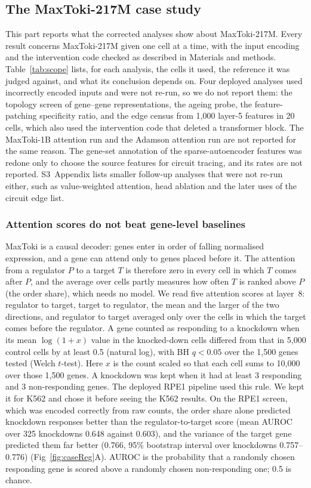 \subsection*{The MaxToki-217M case study}
This part reports what the corrected analyses show about MaxToki-217M.
Every result concerns MaxToki-217M given one cell at a time, with the
input encoding and the intervention code checked as described in
Materials and methods. Table~\ref{tab:scope} lists, for each analysis,
the cells it used, the reference it was judged against, and what its
conclusion depends on. Four deployed analyses used incorrectly encoded
inputs and were not re-run, so we do not report them: the topology
screen of gene--gene representations, the ageing probe, the
feature-patching specificity ratio, and the edge census from 1,000
layer-5 features in 20 cells, which also used the intervention code that
deleted a transformer block. The MaxToki-1B attention run and the
Adamson attention run are not reported for the same reason. The
gene-set annotation of the sparse-autoencoder features was redone only
to choose the source features for circuit tracing, and its rates are not
reported. S3~Appendix lists smaller follow-up analyses that were not
re-run either, such as value-weighted attention, head ablation and the
later uses of the circuit edge list.


\subsubsection*{Attention scores do not beat gene-level baselines}
MaxToki is a causal decoder: genes enter in order of falling normalised
expression, and a gene can attend only to genes placed before it. The
attention from a regulator $P$ to a target $T$ is therefore zero in every
cell in which $T$ comes after $P$, and the average over cells partly
measures how often $T$ is ranked above $P$ (the order share), which
needs no model. We read five attention scores at layer~8: regulator to target, target to
regulator, the mean and the larger of the two directions, and regulator
to target averaged only over the cells in which the target comes before
the regulator. A gene counted as responding to a knockdown when its mean
$\log(1+x)$ value in the knocked-down cells differed from that in 5,000
control cells by at least 0.5 (natural log), with BH $q < 0.05$ over the
1,500 genes tested (Welch $t$-test). Here $x$ is the count scaled so that
each cell sums to 10,000 over those 1,500 genes. A knockdown was kept
when it had at least 3 responding and 3 non-responding genes. The
deployed RPE1 pipeline used this rule. We kept it for K562 and chose it
before seeing the K562 results. On the RPE1 screen, which was encoded
correctly from raw counts, the order share alone predicted knockdown responses better than
the regulator-to-target score (mean AUROC over 325 knockdowns 0.648
against 0.603), and the variance of the target gene predicted them far
better (0.766, 95\% bootstrap interval over knockdowns 0.757--0.776)
(Fig~\ref{fig:caseReg}A). AUROC is the probability that a randomly chosen
responding gene is scored above a randomly chosen non-responding one;
0.5 is chance.

